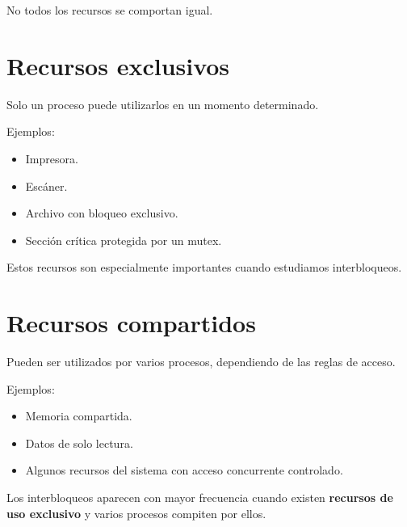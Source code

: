 \documentclass[
  spanish,
  letterpaper,
]{scrbook}
\providecommand{\tightlist}{%
  \setlength{\itemsep}{0pt}\setlength{\parskip}{0pt}}
\begin{document}
No todos los recursos se comportan igual.

\section{Recursos exclusivos}\label{recursos-exclusivos}

Solo un proceso puede utilizarlos en un momento determinado.

Ejemplos:

\begin{itemize}
\tightlist
\item
  Impresora.
\item
  Escáner.
\item
  Archivo con bloqueo exclusivo.
\item
  Sección crítica protegida por un mutex.
\end{itemize}

Estos recursos son especialmente importantes cuando estudiamos
interbloqueos.

\section{Recursos compartidos}\label{recursos-compartidos-1}

Pueden ser utilizados por varios procesos, dependiendo de las reglas de
acceso.

Ejemplos:

\begin{itemize}
\tightlist
\item
  Memoria compartida.
\item
  Datos de solo lectura.
\item
  Algunos recursos del sistema con acceso concurrente controlado.
\end{itemize}

\begin{tcolorbox}[enhanced jigsaw, arc=.35mm, bottomrule=.15mm, bottomtitle=1mm, breakable, colback=white, colbacktitle=quarto-callout-note-color!10!white, colframe=quarto-callout-note-color-frame, coltitle=black, left=2mm, leftrule=.75mm, opacityback=0, opacitybacktitle=0.6, rightrule=.15mm, title=\textcolor{quarto-callout-note-color}{\faInfo}\hspace{0.5em}{Importante}, titlerule=0mm, toprule=.15mm, toptitle=1mm]

Los interbloqueos aparecen con mayor frecuencia cuando existen
\textbf{recursos de uso exclusivo} y varios procesos compiten por ellos.

\end{tcolorbox}
\end{document}
